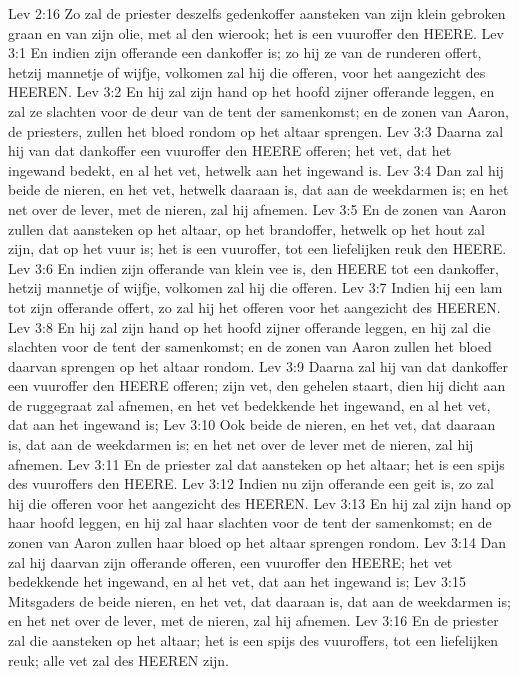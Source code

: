 Lev 2:16  Zo zal de priester deszelfs gedenkoffer aansteken van zijn klein gebroken graan en van zijn olie, met al den wierook; het is een vuuroffer den HEERE.
Lev 3:1  En indien zijn offerande een dankoffer is; zo hij ze van de runderen offert, hetzij mannetje of wijfje, volkomen zal hij die offeren, voor het aangezicht des HEEREN.
Lev 3:2  En hij zal zijn hand op het hoofd zijner offerande leggen, en zal ze slachten voor de deur van de tent der samenkomst; en de zonen van Aaron, de priesters, zullen het bloed rondom op het altaar sprengen.
Lev 3:3  Daarna zal hij van dat dankoffer een vuuroffer den HEERE offeren; het vet, dat het ingewand bedekt, en al het vet, hetwelk aan het ingewand is.
Lev 3:4  Dan zal hij beide de nieren, en het vet, hetwelk daaraan is, dat aan de weekdarmen is; en het net over de lever, met de nieren, zal hij afnemen.
Lev 3:5  En de zonen van Aaron zullen dat aansteken op het altaar, op het brandoffer, hetwelk op het hout zal zijn, dat op het vuur is; het is een vuuroffer, tot een liefelijken reuk den HEERE.
Lev 3:6  En indien zijn offerande van klein vee is, den HEERE tot een dankoffer, hetzij mannetje of wijfje, volkomen zal hij die offeren.
Lev 3:7  Indien hij een lam tot zijn offerande offert, zo zal hij het offeren voor het aangezicht des HEEREN.
Lev 3:8  En hij zal zijn hand op het hoofd zijner offerande leggen, en hij zal die slachten voor de tent der samenkomst; en de zonen van Aaron zullen het bloed daarvan sprengen op het altaar rondom.
Lev 3:9  Daarna zal hij van dat dankoffer een vuuroffer den HEERE offeren; zijn vet, den gehelen staart, dien hij dicht aan de ruggegraat zal afnemen, en het vet bedekkende het ingewand, en al het vet, dat aan het ingewand is;
Lev 3:10  Ook beide de nieren, en het vet, dat daaraan is, dat aan de weekdarmen is; en het net over de lever met de nieren, zal hij afnemen.
Lev 3:11  En de priester zal dat aansteken op het altaar; het is een spijs des vuuroffers den HEERE.
Lev 3:12  Indien nu zijn offerande een geit is, zo zal hij die offeren voor het aangezicht des HEEREN.
Lev 3:13  En hij zal zijn hand op haar hoofd leggen, en hij zal haar slachten voor de tent der samenkomst; en de zonen van Aaron zullen haar bloed op het altaar sprengen rondom.
Lev 3:14  Dan zal hij daarvan zijn offerande offeren, een vuuroffer den HEERE; het vet bedekkende het ingewand, en al het vet, dat aan het ingewand is;
Lev 3:15  Mitsgaders de beide nieren, en het vet, dat daaraan is, dat aan de weekdarmen is; en het net over de lever, met de nieren, zal hij afnemen.
Lev 3:16  En de priester zal die aansteken op het altaar; het is een spijs des vuuroffers, tot een liefelijken reuk; alle vet zal des HEEREN zijn.
